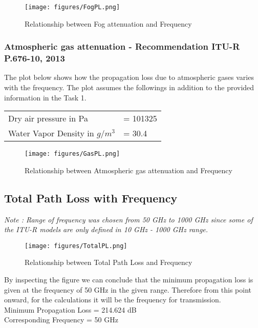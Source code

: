 \documentclass[a4paper,11pt]{article}%
\begin{document}
\begin{figure}[!h]
	\centering
	\texttt{[image: figures/FogPL.png]}
	\caption{Relationship between Fog attenuation  and Frequency}
\end{figure}

\subsubsection{Atmospheric gas attenuation - Recommendation ITU-R P.676-10, 2013\cite{gas}}

The plot below shows how the propagation loss due to atmospheric gases varies with the frequency. The plot assumes the followings in addition to the provided information in the Task 1.

\begin{tabular}{l l}
	 Dry air pressure in Pa&= 101325\\
	 Water Vapor Density in $g/m^3$&= 30.4\cite{vapor}\\
\end{tabular}


\begin{figure}[!h]
	\centering
	\texttt{[image: figures/GasPL.png]}
	\caption{Relationship between Atmospheric gas attenuation and Frequency}
\end{figure}


\subsection{Total Path Loss with Frequency}
\textit{Note : Range of frequency was chosen from 50 GHz to 1000 GHz since some of the ITU-R models are only defined in 10 GHz - 1000 GHz range.}
\begin{figure}[!h]
	\centering
	\texttt{[image: figures/TotalPL.png]}
	\caption{Relationship between Total Path Loss and Frequency}
\end{figure}

By inspecting the figure we can conclude that the minimum propagation loss is given at the frequency of 50 GHz in the given range. Therefore from this point onward, for the calculations it will be the frequency for transmission.\\

Minimum Propagation Loss = 214.624 dB\\
Corresponding Frequency = 50 GHz\\
\end{document}
